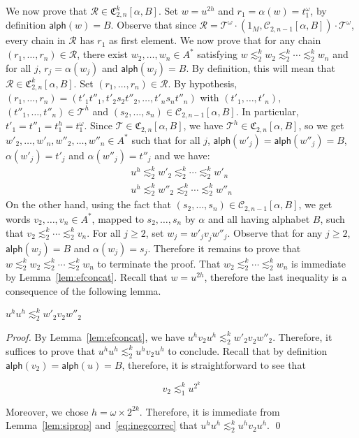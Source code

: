 \documentclass[envcountsame]{llncs}
\newcommand\Cs{\ensuremath{\mathcal{C}}\xspace}
\newcommand\Cstwolen[1]{\ensuremath{\Cs_{2,#1}}\xspace}
\newcommand\fCgen[3]{\ensuremath{\fC_{#1,#3}^{#2}}\xspace}
\newcommand\fCtwon{\ensuremath{\fC_{2,n}}\xspace}
\newcommand\Ts{\ensuremath{\mathcal{T}}\xspace}
\newcommand\Rs{\ensuremath{\mathcal{R}}\xspace}
\newcommand\sieq[2]{\ensuremath{\lesssim^{#1}_{#2}}\xspace}
\newcommand\ksieq[1]{\sieq{k}{#1}}
\let\geq\geqslant
\newcommand\content[1]{\ensuremath{\contentmorphism(#1)}}
\newcommand\contentmorphism{\ensuremath{\textsf{alph}}}
\newcommand\chain{chain\xspace}
\newcommand\fC{\ensuremath{\mathfrak C}\xspace}
\begin{document}
\smallskip We now prove that $\Rs \in \fCgen2{k}{n}[\alpha,B]$. Set $w =
u^{2h}$ and $r_1 = \alpha(w) = t_1^{\omega}$, by definition $\content{w} =
B$. Observe that since $\Rs = \Ts^\omega \cdot (1_M,\Cstwolen{n-1}[\alpha,B])
\cdot \Ts^{\omega}$, every \chain in \Rs has $r_1$ as first element. We now
prove that for any \chain $(r_1,\dots,r_n) \in \Rs$, there exist
$w_2,\dots,w_n \in A^*$ satisfying $w \ksieq{2} w_2 \ksieq{2} \cdots \ksieq{2}
w_n$ and for all $j$, $r_j = \alpha(w_j)$ and $\content{w_j}=B$. By
definition, this will mean that $\Rs \in \fCgen2{k}{n}[\alpha,B]$. Set
$(r_1,\dots,r_n) \in \Rs$. By hypothesis, $(r_1,\dots,r_n) =
(t'_1t''_1,t'_2s_2t''_2,\dots,t'_ns_nt''_n)$ with $(t'_1,\dots,t'_n),$
$(t''_1,\dots,t''_n) \in \Ts^{h}$ and $(s_2,\dots,s_n) \in
\Cstwolen{n-1}[\alpha,B]$. In particular, $t'_1=t''_1 = t_1^{h} =
t_1^\omega$. Since $\Ts\in\fCtwon[\alpha,B]$, we have
$\Ts^h\in\fCtwon[\alpha,B]$, so we get
$w'_2,\dots,w'_n,w''_2,\dots,w''_n \in A^*$ such that for all $j$,
$\content{w'_j} = \content{w''_j} = B$, $\alpha(w'_j) = t'_j$ and
$\alpha(w''_j) = t''_j$ and we have:
\begin{eqnarray*}
  u^{h} \ksieq{2} w'_2 \ksieq{2} \cdots \ksieq{2} w'_n \\
  u^{h} \ksieq{2} w''_2 \ksieq{2} \cdots \ksieq{2} w''_n
\end{eqnarray*}
On the other hand, using the fact that $(s_2,\dots,s_n) \in
\Cstwolen{n-1}[\alpha,B]$, we get words $v_2,\dots,v_n \in A^*$, mapped to
$s_2,\dots,s_n$ by $\alpha$ and all having alphabet $B$, such that $v_2 \ksieq{2}
\cdots \ksieq{2} v_n$. For all $j \geq 2$, set $w_j =
w'_jv^{}_jw''_j$. Observe that for any $j \geq 2$, $\content{w_j} = B$ 
and $\alpha(w_j) = s_j$. Therefore it remains to prove that $w
\ksieq{2} w_2 \ksieq{2} \cdots \ksieq{2} w_n$ to terminate the
proof. That $w_2 \ksieq{2} \cdots \ksieq{2} w_n$ is immediate by
Lemma~\ref{lem:efconcat}. Recall that $w = u^{2h}$, therefore the
last inequality is a consequence of the following lemma.

\begin{lemma} \label{lem:efcorrec}
  $u^{h}u^{h} \ksieq{2} w'_2v^{}_2w''_2$
\end{lemma}


\begin{proof}
  By Lemma~\ref{lem:efconcat}, we have $u^{h} v_2 u^{h} \ksieq{2} 
  w'_2v^{}_2w''_2$. Therefore, it suffices to prove that $u^{h}u^{h}
  \ksieq{2} u^{h}v_2u^{h}$ to conclude. Recall that by definition
  $\content{v_2} = \content{u} = B$, therefore, it is straightforward to
  see that 

  \begin{equation} \label{eq:inegcorrec}
    v_2 \sieq{k}{1} u^{2^k}
  \end{equation}

  Moreover, we chose $h = \omega  \times   2^{2k}$. Therefore, it is immediate from Lemma~\ref{lem:siprop}
  and~\eqref{eq:inegcorrec} that $u^{h}u^{h} \ksieq{2}
  u^{h}v_2u^{h}$. \qed 
\end{proof}
\end{document}
